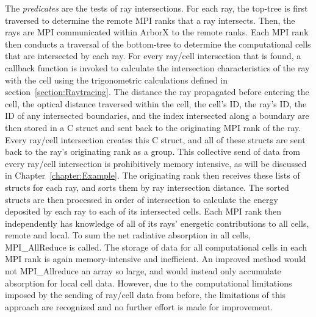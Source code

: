 The \textit{predicates} are the tests of ray intersections. For each ray, the top-tree is first traversed to determine the remote MPI ranks that a ray intersects.  Then, the rays are MPI communicated within ArborX to the remote ranks. Each MPI rank then conducts a traversal of the bottom-tree to determine the computational cells that are intersected by each ray. For every ray/cell intersection that is found, a callback function is invoked to calculate the intersection characteristics of the ray with the cell using the trigonometric calculations defined in section~\ref{section:Raytracing}. The distance the ray propagated before entering the cell, the optical distance traversed within the cell, the cell's ID, the ray's ID, the ID of any intersected boundaries, and the index intersected along a boundary are then stored in a C struct and sent back to the originating MPI rank of the ray.
Every ray/cell intersection creates this C struct, and all of these structs are sent back to the ray's originating rank as a group. This collective send of data from every ray/cell intersection is prohibitively memory intensive, as will be discussed in Chapter~\ref{chapter:Example}. The originating rank then receives these lists of structs for each ray, and sorts them by ray intersection distance. The sorted structs are then processed in order of intersection to calculate the energy deposited by each ray to each of its intersected cells. Each MPI rank then independently has knowledge of all of its rays' energetic contributions to all cells, remote and local. To sum the net radiative absorption in all cells, MPI\_AllReduce is called. The storage of data for all computational cells in each MPI rank is again memory-intensive and inefficient. An improved method would not MPI\_Allreduce an array so large, and would instead only accumulate absorption for local cell data. However, due to the computational limitations imposed by the sending of ray/cell data from before, the limitations of this approach are recognized and no further effort is made for improvement.


